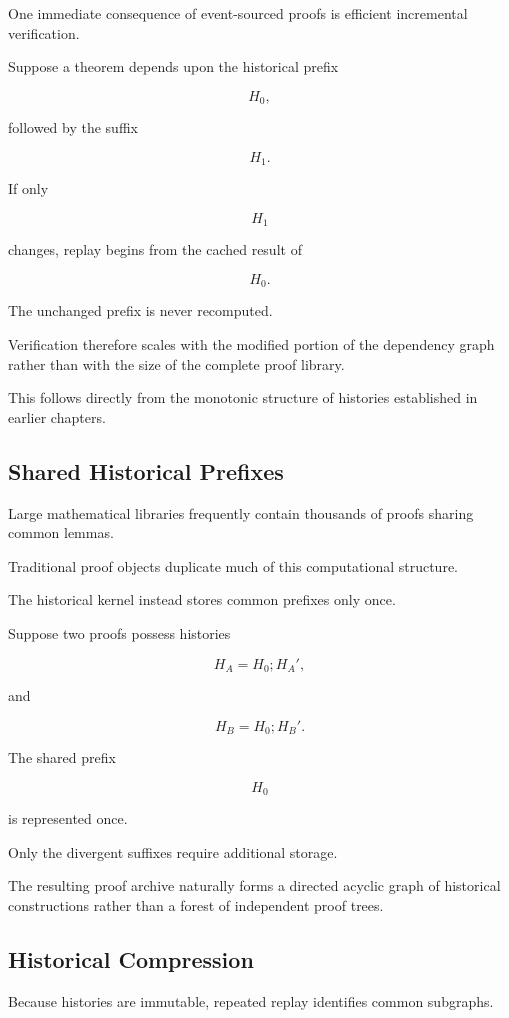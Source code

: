 \documentclass[12pt,oneside]{article}
\theoremstyle{definition}
\theoremstyle{remark}
\begin{document}
One immediate consequence of event-sourced proofs is efficient incremental
verification.

Suppose a theorem depends upon the historical prefix

\[
H_0,
\]

followed by the suffix

\[
H_1.
\]

If only

\[
H_1
\]

changes, replay begins from the cached result of

\[
H_0.
\]

The unchanged prefix is never recomputed.

Verification therefore scales with the modified portion of the dependency graph
rather than with the size of the complete proof library.

This follows directly from the monotonic structure of histories established in
earlier chapters.

\subsection{Shared Historical Prefixes}

Large mathematical libraries frequently contain thousands of proofs sharing
common lemmas.

Traditional proof objects duplicate much of this computational structure.

The historical kernel instead stores common prefixes only once.

Suppose two proofs possess histories

\[
H_A
=
H_0;
H_A',
\]

and

\[
H_B
=
H_0;
H_B'.
\]

The shared prefix

\[
H_0
\]

is represented once.

Only the divergent suffixes require additional storage.

The resulting proof archive naturally forms a directed acyclic graph of
historical constructions rather than a forest of independent proof trees.

\subsection{Historical Compression}

Because histories are immutable, repeated replay identifies common subgraphs.
\end{document}
